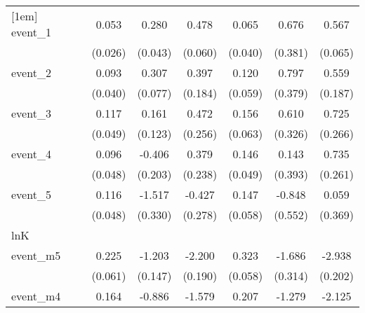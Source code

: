 {\begin{tabular}{l*{6}{c}}
[1em]
event\_1     &       0.053\sym{*}  &       0.280\sym{***}&       0.478\sym{***}&       0.065         &       0.676         &       0.567\sym{***}\\
            &     (0.026)         &     (0.043)         &     (0.060)         &     (0.040)         &     (0.381)         &     (0.065)         \\
[1em]
event\_2     &       0.093\sym{*}  &       0.307\sym{***}&       0.397\sym{*}  &       0.120\sym{*}  &       0.797\sym{*}  &       0.559\sym{**} \\
            &     (0.040)         &     (0.077)         &     (0.184)         &     (0.059)         &     (0.379)         &     (0.187)         \\
[1em]
event\_3     &       0.117\sym{*}  &       0.161         &       0.472         &       0.156\sym{*}  &       0.610         &       0.725\sym{**} \\
            &     (0.049)         &     (0.123)         &     (0.256)         &     (0.063)         &     (0.326)         &     (0.266)         \\
[1em]
event\_4     &       0.096\sym{*}  &      -0.406\sym{*}  &       0.379         &       0.146\sym{**} &       0.143         &       0.735\sym{**} \\
            &     (0.048)         &     (0.203)         &     (0.238)         &     (0.049)         &     (0.393)         &     (0.261)         \\
[1em]
event\_5     &       0.116\sym{*}  &      -1.517\sym{***}&      -0.427         &       0.147\sym{*}  &      -0.848         &       0.059         \\
            &     (0.048)         &     (0.330)         &     (0.278)         &     (0.058)         &     (0.552)         &     (0.369)         \\
\hline
lnK         &                     &                     &                     &                     &                     &                     \\
event\_m5    &       0.225\sym{***}&      -1.203\sym{***}&      -2.200\sym{***}&       0.323\sym{***}&      -1.686\sym{***}&      -2.938\sym{***}\\
            &     (0.061)         &     (0.147)         &     (0.190)         &     (0.058)         &     (0.314)         &     (0.202)         \\
[1em]
event\_m4    &       0.164\sym{**} &      -0.886\sym{***}&      -1.579\sym{***}&       0.207\sym{**} &      -1.279\sym{***}&      -2.125\sym{***}\\

\end{tabular}}
